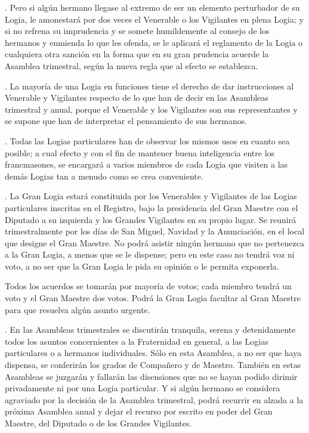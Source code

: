 \documentclass[a4paper,12pt,twoside]{book}
\begin{document}
. Pero si algún hermano llegase al extremo de ser un elemento perturbador de su Logia, le amonestará por dos veces el Venerable o los Vigilantes en plena Logia; y si no refrena su imprudencia y se somete humildemente al consejo de los hermanos y enmienda lo que les ofenda, se le aplicará el reglamento de la Logia o cualquiera otra sanción en la forma que en su gran prudencia acuerde la Asamblea trimestral, según la nueva regla que al efecto se establezca.

\vspace{0.3cm}

. La mayoría de una Logia en funciones tiene el derecho de dar instrucciones al Venerable y Vigilantes respecto de lo que han de decir en las Asambleas trimestral y anual, porque el Venerable y los Vigilantes son sus representantes y se supone que han de interpretar el pensamiento de sus hermanos.

\vspace{0.3cm}

. Todas las Logias particulares han de observar los mismos usos en cuanto sea posible; a cual efecto y con el fin de mantener buena inteligencia entre los francmasones, se encargará a varios miembros de cada Logia que visiten a las demás Logias tan a menudo como se crea conveniente.

\vspace{0.3cm}

. La Gran Logia estará constituida por los Venerables y Vigilantes de las Logias particulares inscritas en el Registro, bajo la presidencia del Gran Maestre con el Diputado a su izquierda y los Grandes Vigilantes en su propio lugar. Se reunirá trimestralmente por los días de San Miguel, Navidad y la Anunciación, en el local que designe el Gran Maestre. No podrá asistir ningún hermano que no pertenezca a la Gran Logia, a menos que se le dispense; pero en este caso no tendrá voz ni voto, a no ser que la Gran Logia le pida su opinión o le permita exponerla.

\noindent Todos los acuerdos se tomarán por mayoría de votos; cada miembro tendrá un voto y el Gran Maestre dos votos. Podrá la Gran Logia facultar al Gran Maestre para que resuelva algún asunto urgente.

\vspace{0.3cm}

. En las Asambleas trimestrales se discutirán tranquila, serena y detenidamente todos los asuntos concernientes a la Fraternidad en general, a las Logias particulares o a hermanos individuales. Sólo en esta Asamblea, a no ser que haya dispensa, se conferirán los grados de Compañero y de Maestro. También en estas Asambleas se juzgarán y fallarán las disensiones que no se hayan podido dirimir privadamente ni por una Logia particular. Y si algún hermano se considera agraviado por la decisión de la Asamblea trimestral, podrá recurrir en alzada a la próxima Asamblea anual y dejar el recurso por escrito en poder del Gran Maestre, del Diputado o de los Grandes Vigilantes.
\end{document}
